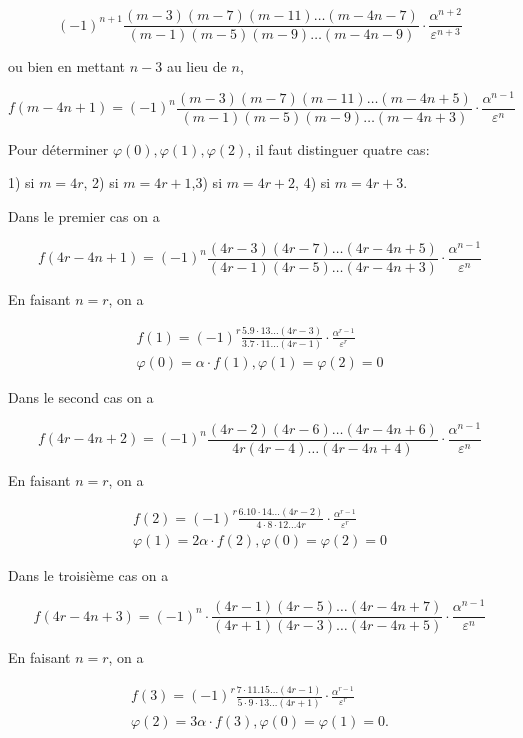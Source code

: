 \documentclass{article}
\begin{document}
\[
(-1)^{n+1} \frac{(m-3)(m-7)(m-11) \ldots(m-4 n-7)}{(m-1)(m-5)(m-9) \ldots(m-4 n-9)} \cdot \frac{\alpha^{n+2}}{\varepsilon^{n+3}}
\]

ou bien en mettant \(n-3\) au lieu de \(n\),

\[
f(m-4 n+1)=(-1)^{n} \frac{(m-3)(m-7)(m-11) \ldots(m-4 n+5)}{(m-1)(m-5)(m-9) \ldots(m-4 n+3)} \cdot \frac{\alpha^{n-1}}{\varepsilon^{n}}
\]

Pour déterminer \(\varphi(0), \varphi(1), \varphi(2)\), il faut distinguer quatre cas:

1) si \(m=4 r\), 2) si \(m=4 r+1\),3) si \(m=4 r+2\), 4) si \(m=4 r+3\).

Dans le premier cas on a

\[
f(4 r-4 n+1)=(-1)^{n} \frac{(4 r-3)(4 r-7) \ldots(4 r-4 n+5)}{(4 r-1)(4 r-5) \ldots(4 r-4 n+3)} \cdot \frac{\alpha^{n-1}}{\varepsilon^{n}}
\]

En faisant \(n=r\), on a

\[
\begin{gathered}
f(1)=(-1)^{r} \frac{5.9 \cdot 13 \ldots(4 r-3)}{3.7 \cdot 11 \ldots(4 r-1)} \cdot \frac{\alpha^{r-1}}{\varepsilon^{r}} \\
\varphi(0)=\alpha \cdot f(1), \varphi(1)=\varphi(2)=0
\end{gathered}
\]

Dans le second cas on a

\[
f(4 r-4 n+2)=(-1)^{n} \frac{(4 r-2)(4 r-6) \ldots(4 r-4 n+6)}{4 r(4 r-4) \ldots(4 r-4 n+4)} \cdot \frac{\alpha^{n-1}}{\varepsilon^{n}}
\]

En faisant \(n=r\), on a

\[
\begin{gathered}
f(2)=(-1)^{r} \frac{6.10 \cdot 14 \ldots(4 r-2)}{4 \cdot 8 \cdot 12 \ldots 4 r} \cdot \frac{\alpha^{r-1}}{\varepsilon^{r}} \\
\varphi(1)=2 \alpha \cdot f(2), \varphi(0)=\varphi(2)=0
\end{gathered}
\]

Dans le troisième cas on a

\[
f(4 r-4 n+3)=(-1)^{n} \cdot \frac{(4 r-1)(4 r-5) \ldots(4 r-4 n+7)}{(4 r+1)(4 r-3) \ldots(4 r-4 n+5)} \cdot \frac{\alpha^{n-1}}{\varepsilon^{n}}
\]

En faisant \(n=r\), on a

\[
\begin{gathered}
f(3)=(-1)^{r} \frac{7 \cdot 11.15 \ldots(4 r-1)}{5 \cdot 9 \cdot 13 \ldots(4 r+1)} \cdot \frac{\alpha^{r-1}}{\varepsilon^{r}} \\
\varphi(2)=3 \alpha \cdot f(3), \varphi(0)=\varphi(1)=0 .
\end{gathered}
\]
\end{document}
